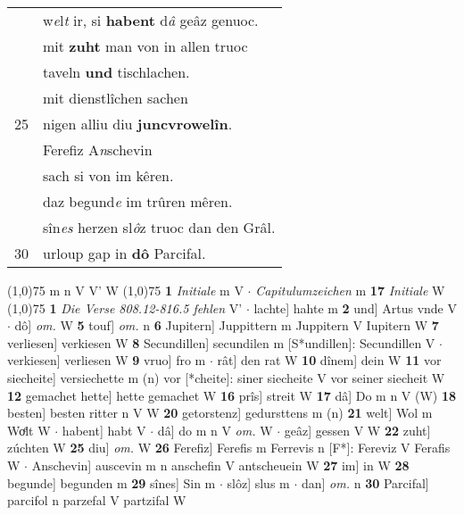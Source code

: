 \documentclass[8pt,a4paper,notitlepage]{article}
\begin{document}
\begin{table}[ht]
\begin{minipage}[t]{0.5\linewidth}
\begin{tabular}{rl}
 & w\textit{e}l\textit{t} ir, si \textbf{habent} d\textit{â} geâz genuoc.\\ 
 & mit \textbf{zuht} man von in allen truoc\\ 
 & taveln \textbf{und} tischlachen.\\ 
 & mit dienstlîchen sachen\\ 
25 & nigen alliu diu \textbf{juncvrowelîn}.\\ 
 & Ferefiz A\textit{n}schevin\\ 
 & sach si von im kêren.\\ 
 & daz begund\textit{e} im trûren mêren.\\ 
 & sîn\textit{es} herzen sl\textit{ô}z truoc dan den Grâl.\\ 
30 & urloup gap in \textbf{dô} Parcifal.\\ 
\end{tabular}
\scriptsize
\line(1,0){75} \newline
m n V V' W \newline
\line(1,0){75} \newline
\textbf{1} \textit{Initiale} m V   $\cdot$ \textit{Capitulumzeichen} m  \textbf{17} \textit{Initiale} W  \newline
\line(1,0){75} \newline
\textbf{1} \textit{Die Verse 808.12-816.5 fehlen} V'   $\cdot$ lachte] hahte m \textbf{2} und] Artus vnde V  $\cdot$ dô] \textit{om.} W \textbf{5} touf] \textit{om.} n \textbf{6} Jupitern] Juppittern m Juppitern V Iupitern W \textbf{7} verliesen] verkiesen W \textbf{8} Secundillen] secundilen m [S*undillen]: Secundillen V  $\cdot$ verkiesen] verliesen W \textbf{9} vruo] fro m  $\cdot$ rât] den rat W \textbf{10} dînem] dein W \textbf{11} vor siecheite] versiechette m (n) vor [*cheite]: siner siecheite  V vor seiner siecheit W \textbf{12} gemachet hette] hette gemachet W \textbf{16} prîs] streit W \textbf{17} dâ] Do m n V (W) \textbf{18} besten] besten ritter n V W \textbf{20} getorstenz] gedursttens m (n) \textbf{21} welt] Wol m Woͤlt W  $\cdot$ habent] habt V  $\cdot$ dâ] do m n V \textit{om.} W  $\cdot$ geâz] gessen V W \textbf{22} zuht] zúchten W \textbf{25} diu] \textit{om.} W \textbf{26} Ferefiz] Ferefis m Ferrevis n [F*]: Fereviz V Ferafis W  $\cdot$ Anschevin] auscevin m n anschefin V antscheuein W \textbf{27} im] in W \textbf{28} begunde] begunden m \textbf{29} sînes] Sin m  $\cdot$ slôz] slus m  $\cdot$ dan] \textit{om.} n \textbf{30} Parcifal] parcifol n parzefal V partzifal W \newline
\end{minipage}
\end{table}
\end{document}
